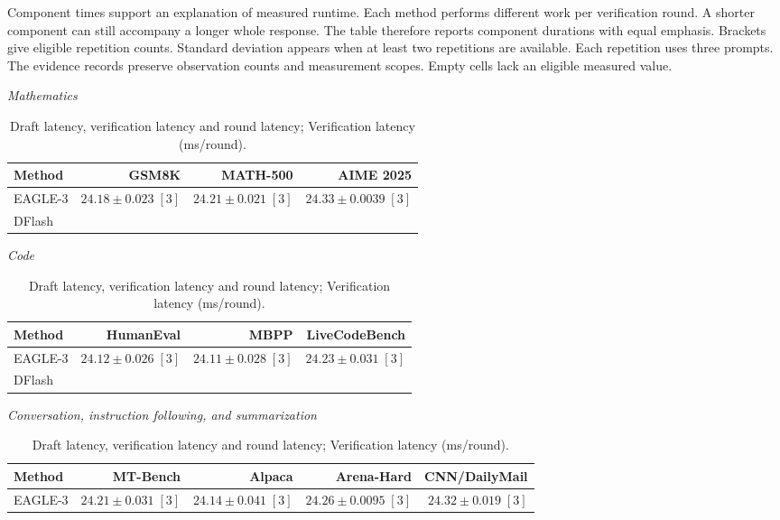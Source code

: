 \begin{table}[!htp]
\begin{minipage}{\linewidth}
Component times support an explanation of measured runtime. Each method performs different work per verification round. A shorter component can still accompany a longer whole response. The table therefore reports component durations with equal emphasis.
Brackets give eligible repetition counts. Standard deviation appears when at least two repetitions are available. Each repetition uses three prompts. The evidence records preserve observation counts and measurement scopes. Empty cells lack an eligible measured value.
\end{minipage}
\end{table}

\begin{table}[!htp]
\centering\small
\setlength{\tabcolsep}{3pt}
\caption{Draft latency, verification latency and round latency; Verification latency (ms/round).}
\label{tab:appendix-metric-component-time-verification-latency-none}
\textit{Mathematics}\par\smallskip
\begin{tabular}{@{}>{\raggedright\arraybackslash}p{3.7cm}rrr@{}}
\toprule
Method & GSM8K & MATH-500 & AIME 2025 \\
\midrule
EAGLE-3 & \(24.18 \pm 0.023\;[3]\) & \(24.21 \pm 0.021\;[3]\) & \(24.33 \pm 0.0039\;[3]\) \\
DFlash &  &  &  \\
\bottomrule
\end{tabular}\par\medskip
\textit{Code}\par\smallskip
\begin{tabular}{@{}>{\raggedright\arraybackslash}p{3.7cm}rrr@{}}
\toprule
Method & HumanEval & MBPP & LiveCodeBench \\
\midrule
EAGLE-3 & \(24.12 \pm 0.026\;[3]\) & \(24.11 \pm 0.028\;[3]\) & \(24.23 \pm 0.031\;[3]\) \\
DFlash &  &  &  \\
\bottomrule
\end{tabular}\par\medskip
\textit{Conversation, instruction following, and summarization}\par\smallskip
\begin{tabular}{@{}>{\raggedright\arraybackslash}p{3.7cm}rrrr@{}}
\toprule
Method & MT-Bench & Alpaca & Arena-Hard & CNN/DailyMail \\
\midrule
EAGLE-3 & \(24.21 \pm 0.031\;[3]\) & \(24.14 \pm 0.041\;[3]\) & \(24.26 \pm 0.0095\;[3]\) & \(24.32 \pm 0.019\;[3]\) \\

\end{tabular}
\end{table}

